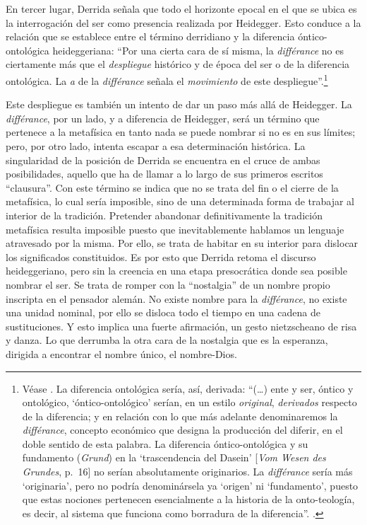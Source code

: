 En tercer lugar, Derrida señala que todo el horizonte epocal en el que se ubica es la interrogación del ser como presencia realizada por Heidegger. Esto conduce a la relación que se establece entre el término derridiano y la diferencia óntico-ontológica heideggeriana: \enquote{Por una cierta cara de sí misma, la \emph{différance} no es ciertamente más que el \emph{despliegue} histórico y de época del ser o de la diferencia ontológica. La \emph{a} de la \emph{différance} señala el \emph{movimiento} de este despliegue}.\footnote{Véase \cite[23]{@6983-DERRIDA1989}. La diferencia ontológica sería, así, derivada: \enquote{(\ldots) ente y ser, óntico y ontológico, \enquote{óntico-ontológico} serían, en un estilo \emph{original}, \emph{derivados} respecto de la diferencia; y en relación con lo que más adelante denominaremos la \emph{différance}, concepto económico que designa la producción del diferir, en el doble sentido de esta palabra. La diferencia óntico-ontológica y su fundamento (\emph{Grund}) en la \enquote{trascendencia del Dasein} {[}\emph{Vom Wesen des Grundes}, p.~16{]} no serían absolutamente originarios. La \emph{différance} sería más \enquote{originaria}, pero no podría denominársela ya \enquote{origen} ni \enquote{fundamento}, puesto que estas nociones pertenecen esencialmente a la historia de la onto-teología, es decir, al sistema que funciona como borradura de la diferencia}. \cite[32]{@6984-DERRIDA1998}.}

Este despliegue es también un intento de dar un paso más allá de Heidegger. La \emph{différance}, por un lado, y a diferencia de Heidegger, será un término que pertenece a la metafísica en tanto nada se puede nombrar si no es en sus límites; pero, por otro lado, intenta escapar a esa determinación histórica. La singularidad de la posición de Derrida se encuentra en el cruce de ambas posibilidades, aquello que ha de llamar a lo largo de sus primeros escritos \enquote{clausura}. Con este término se indica que no se trata del fin o el cierre de la metafísica, lo cual sería imposible, sino de una determinada forma de trabajar al interior de la tradición. Pretender abandonar definitivamente la tradición metafísica resulta imposible puesto que inevitablemente hablamos un lenguaje atravesado por la misma. Por ello, se trata de habitar en su interior para dislocar los significados constituidos. Es por esto que Derrida retoma el discurso heideggeriano, pero sin la creencia en una etapa presocrática donde sea posible nombrar el ser. Se trata de romper con la \enquote{nostalgia} de un nombre propio inscripta en el pensador alemán. No existe nombre para la \emph{différance}, no existe una unidad nominal, por ello se disloca todo el tiempo en una cadena de sustituciones. Y esto implica una fuerte afirmación, un gesto nietzscheano de risa y danza. Lo que derrumba la otra cara de la nostalgia que es la esperanza, dirigida a encontrar el nombre único, el nombre-Dios.


